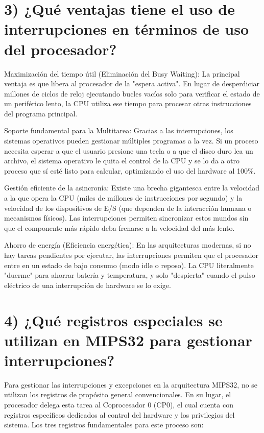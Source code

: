 \documentclass[12pt]{article}
\begin{document}
\vspace{1cm}

\section*{3) ¿Qué ventajas tiene el uso de interrupciones en términos de uso del procesador?} 

Maximización del tiempo útil (Eliminación del Busy Waiting): La principal ventaja es que libera al procesador de la "espera activa". En lugar de desperdiciar millones de ciclos de reloj ejecutando bucles vacíos solo para verificar el estado de un periférico lento, la CPU utiliza ese tiempo para procesar otras instrucciones del programa principal. 

Soporte fundamental para la Multitarea: Gracias a las interrupciones, los sistemas operativos pueden gestionar múltiples programas a la vez. Si un proceso necesita esperar a que el usuario presione una tecla o a que el disco duro lea un archivo, el sistema operativo le quita el control de la CPU y se lo da a otro proceso que sí esté listo para calcular, optimizando el uso del hardware al 100\%. 

Gestión eficiente de la asincronía: Existe una brecha gigantesca entre la velocidad a la que opera la CPU (miles de millones de instrucciones por segundo) y la velocidad de los dispositivos de E/S (que dependen de la interacción humana o mecanismos físicos). Las interrupciones permiten sincronizar estos mundos sin que el componente más rápido deba frenarse a la velocidad del más lento. 

Ahorro de energía (Eficiencia energética): En las arquitecturas modernas, si no hay tareas pendientes por ejecutar, las interrupciones permiten que el procesador entre en un estado de bajo consumo (modo idle o reposo).  La CPU literalmente "duerme" para ahorrar batería y temperatura, y solo "despierta" cuando el pulso eléctrico de una interrupción de hardware se lo exige.

\vspace{1cm}

\section*{4) ¿Qué registros especiales se utilizan en MIPS32 para gestionar interrupciones?} 

Para gestionar las interrupciones y excepciones en la arquitectura MIPS32, no se utilizan los registros de propósito general convencionales. En su lugar, el procesador delega esta tarea al Coprocesador 0 (CP0), el cual cuenta con registros específicos dedicados al control del hardware y los privilegios del sistema. Los tres registros fundamentales para este proceso son: 
\end{document}
